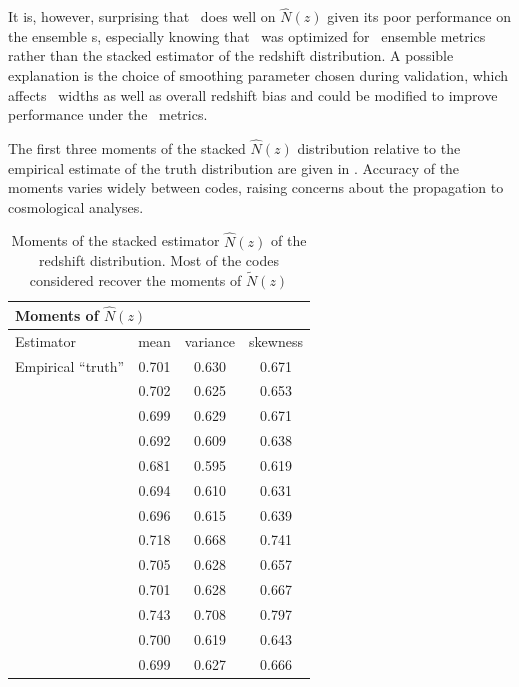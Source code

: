 It is, however, surprising that \tpz\ does well on $\hat{N}(z)$ given its poor performance on the ensemble \pzpdf s, especially knowing that \tpz\ was optimized for \pzpdf\ ensemble metrics rather than the stacked estimator of the redshift distribution.
A possible explanation is the choice of smoothing parameter chosen during validation, which affects \pzpdf\ widths as well as overall redshift bias and could be modified to improve performance under the \pzpdf\ metrics.

The first three moments of the stacked $\hat{N}(z)$ distribution relative to the empirical estimate of the truth distribution are given in .
Accuracy of the moments varies widely between codes, raising concerns about the propagation to cosmological analyses.

\begin{table}
	\begin{center}
	\setlength{\tabcolsep}{2pt}
	\caption{Moments of the stacked estimator $\hat{N}(z)$ of the redshift distribution.
		Most of the codes considered recover the moments of $\tilde{N}(z)$}
	\begin{tabular}{lccc}
		\hline
		\hline
		\multicolumn{4}{l}{Moments of $\hat{N}(z)$} \\
		\hline
		Estimator  & mean       & variance    & skewness \\
		Empirical ``truth'' & 0.701 & 0.630 & 0.671  \\
		\hline
		\annz       & 0.702      & 0.625      & 0.653    \\
		\bpz        & 0.699      & 0.629      & 0.671    \\
		\delight    & 0.692      & 0.609      & 0.638    \\
		\eazy       & 0.681      & 0.595      & 0.619    \\
		\flexzboost & 0.694      & 0.610      & 0.631    \\
		\gpz        & 0.696      & 0.615      & 0.639    \\
		\lephare    & 0.718      & 0.668      & 0.741    \\
		\metaphor   & 0.705      & 0.628      & 0.657    \\
		\cmnn       & 0.701      & 0.628      & 0.667    \\
		\skynet     & 0.743      & 0.708      & 0.797    \\
		\tpz        & 0.700      & 0.619      & 0.643    \\
		\hline
		\trainz	    & 0.699 		 & 0.627 	    & 0.666 \\
	\end{tabular}
\end{center}
\end{table}

